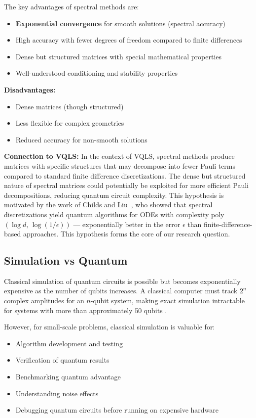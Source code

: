 \documentclass[a4paper,12pt]{amsart}
\begin{document}
The key advantages of spectral methods are:
\begin{itemize}
\item \textbf{Exponential convergence} for smooth solutions (spectral accuracy)
\item High accuracy with fewer degrees of freedom compared to finite differences
\item Dense but structured matrices with special mathematical properties
\item Well-understood conditioning and stability properties
\end{itemize}

\textbf{Disadvantages:}
\begin{itemize}
\item Dense matrices (though structured)
\item Less flexible for complex geometries
\item Reduced accuracy for non-smooth solutions
\end{itemize}

\textbf{Connection to VQLS:}
In the context of VQLS, spectral methods produce matrices with specific structures that may decompose into fewer Pauli terms compared to standard finite difference discretizations. The dense but structured nature of spectral matrices could potentially be exploited for more efficient Pauli decompositions, reducing quantum circuit complexity. This hypothesis is motivated by the work of Childs and Liu~\cite{childs2020spectral}, who showed that spectral discretizations yield quantum algorithms for ODEs with complexity poly$(\log d,\, \log(1/\epsilon))$ — exponentially better in the error $\epsilon$ than finite-difference-based approaches. This hypothesis forms the core of our research question.

\subsection{Simulation vs Quantum}
Classical simulation of quantum circuits is possible but becomes exponentially expensive as the number of qubits increases. A classical computer must track $2^n$ complex amplitudes for an $n$-qubit system, making exact simulation intractable for systems with more than approximately 50 qubits \cite{nielsen2011quantum, hidary2021quantum}.

However, for small-scale problems, classical simulation is valuable for:
\begin{itemize}
\item Algorithm development and testing
\item Verification of quantum results
\item Benchmarking quantum advantage
\item Understanding noise effects
\item Debugging quantum circuits before running on expensive hardware
\end{itemize}
\end{document}

